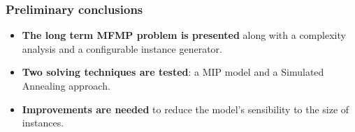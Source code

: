 \begin{frame}
\frametitle{\textbf{Preliminary conclusions}}
    \begin{itemize}[<+->]
    \item \textbf{The long term MFMP problem is presented}
      along with a complexity analysis and a configurable instance generator.
    \item \textbf{Two solving techniques are tested}:
      a MIP model and a Simulated Annealing approach.  
    \item \textbf{Improvements are needed} 
      to reduce the model's sensibility to the size of instances.
    \end{itemize}
      
        
\end{frame}
